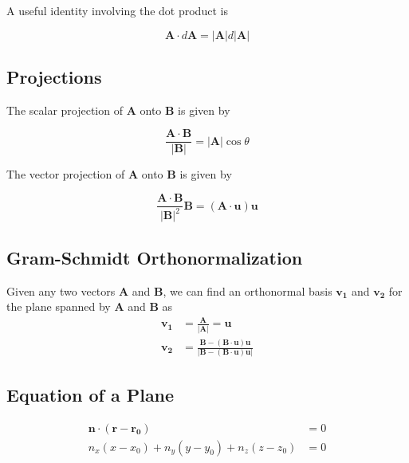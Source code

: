 A useful identity involving the dot product is

\begin{equation*}
    \mathbf{A} \cdot d\mathbf{A} = |\mathbf{A}| d|\mathbf{A}|
\end{equation*}

\subsection{Projections}
The scalar projection of $\mathbf{A}$ onto $\mathbf{B}$ is given by

\begin{equation*}
    \frac{\mathbf{A}\cdot\mathbf{B}}{|\mathbf{B}|} = |\mathbf{A}|\cos\theta
\end{equation*}

The vector projection of $\mathbf{A}$ onto $\mathbf{B}$ is given by

\begin{equation*}
    \frac{\mathbf{A}\cdot\mathbf{B}}{|\mathbf{B}|^2}\mathbf{B} = (\mathbf{A}\cdot\mathbf{u})\mathbf{u}
\end{equation*}

\subsection{Gram-Schmidt Orthonormalization}

Given any two vectors $\mathbf{A}$ and $\mathbf{B}$, we can find an orthonormal basis $\mathbf{v_1}$ and $\mathbf{v_2}$ for the plane spanned by $\mathbf{A}$ and $\mathbf{B}$ as
\begin{align*}
    \mathbf{v_1} & = \frac{\mathbf{A}}{|\mathbf{A}|} = \mathbf{u}                                                                    \\
    \mathbf{v_2} & = \frac{\mathbf{B} - (\mathbf{B}\cdot\mathbf{u})\mathbf{u}}{|\mathbf{B} - (\mathbf{B}\cdot\mathbf{u})\mathbf{u}|}
\end{align*}

\subsection{Equation of a Plane}

\begin{align*}
    \mathbf{n} \cdot (\mathbf{r} - \mathbf{r_0}) & = 0 \\
    n_x(x-x_0) + n_y(y-y_0) + n_z(z-z_0)         & = 0
\end{align*}

